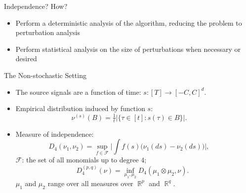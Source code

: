 \documentclass[final]{beamer} %
\DeclareMathOperator{\real}{\mathbb{R}}
\begin{document}
\begin{frame}[c]
\begin{columns}[t,totalwidth=\textwidth]
\begin{column}{.32\textwidth}
\begin{block}{Independence?}
			\centering \vspace{0.5ex}
				{\large How? }
				\vspace{0.5ex}
			\begin{itemize}
				\item Perform a deterministic analysis of the algorithm, reducing the problem to perturbation analysis
				\item Perform statistical analysis on the size of perturbations when necessary or desired
			\end{itemize}
		\end{block}
		\vspace{0.5ex}
		\begin{block}{The Non-stochastic Setting}
			\begin{itemize}
				\item The source signals are a function of time: $s:[T] \to [-C,C]^d$.
				\item Empirical distribution induced by function $s$:
				\[
					\nu^{(s)}(B)=\tfrac{1}{t}|\{\tau \in [t]: s(\tau) \in B\}|.
				\]
				\item Measure of independence:
					\[
					D_4(\nu_1,\nu_2)	= \sup_{f\in\mathcal{F}} \big|\int f(s) \big(\nu_1(ds) -\nu_2(ds)\big) \big|,
					\]
				 $\mathcal{F}$: the set of all monomials up to degree $4$; 
				  \[ \quad D_4^{(p,q)} (\nu)= \inf_{\mu_1,\mu_2} D_4(\mu_1\otimes \mu_2,\nu).
				  \]
				  $\mu_1$ and $\mu_2$ range over all measures over $\real^p$ and $\real^q$.
			\end{itemize}
		\end{block}
		

	\end{column}
	\begin{column}{0.01\textwidth}
	\end{column}
	

\end{columns}
\end{frame}
\end{document}
